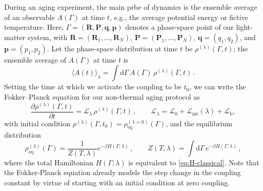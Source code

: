 During an aging experiment, the main prbe of dynamics is the ensemble average of an observable 
$A(\Gamma)$ at time $t$, e.g., the average potential energy or fictive temperature. Here, $\Gamma=(\bm R, \bm P, \bm q, \bm p)$ denotes a phase-space point of our light-matter system, with $\bm R = (\bm R_1,\ldots,\bm R_N)$, $\bm P = (\bm P_1,\ldots,\bm P_N)$, $\bm q = (q_1,q_2)$, and $\bm p = (p_1,p_2)$. Let the phase-space distribution at time $t$ be $\rho^{(\lambda)}(\Gamma,t)$; the ensemble average of $A(\Gamma)$ at time $t$ is
\begin{equation}
\langle A(t) \rangle_\lambda = \int \mathrm{d}\Gamma\, A(\Gamma)\,
\rho^{(\lambda)}(\Gamma, t) \,.
\end{equation}
Setting the time at which we activate the coupling to be $t_0$, we can write the Fokker--Planck equation\cite{risken1996fokker} for our non-thermal aging protocol as
\begin{equation}
\frac{\partial \rho^{(\lambda)}(\Gamma,t)}{\partial t} 
= \mathcal{L}_\lambda\,\rho^{(\lambda)}(\Gamma,t) \,,
\qquad
\mathcal{L}_\lambda= \mathcal{L}_0 + \mathcal{L}_\mathrm{int}(\lambda) + \mathcal{L}_\mathrm{b},
\end{equation}
with initial condition $\rho^{(\lambda)}(\Gamma,t_0) = \rho_\mathrm{eq}^{(\lambda=0)}(\Gamma)$, and the equilibrium distribution
\begin{equation}
\rho_\mathrm{eq}^{(\lambda)}(\Gamma) = \frac{1}{Z(T, \lambda)}e^{-\beta H(\Gamma;\lambda)} \,, 
\qquad 
Z(T, \lambda) = \int \mathrm{d} \Gamma \, e^{-\beta H(\Gamma;\lambda)} \,,
\end{equation}
where the total Hamiltonian $H(\Gamma; \lambda)$ is equivalent to \cref{eq:H-classical}. Note that the Fokker-Planck equation already models the step change in the coupling constant by virtue of starting with an initial condition at zero coupling.  

